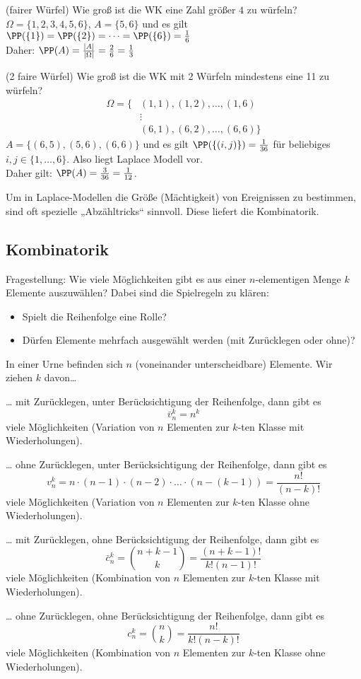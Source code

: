 \begin{anumerate}
\item (fairer Würfel) Wie groß ist die WK eine Zahl größer $4$ zu würfeln?\\
$\Omega = \{1,2,3,4,5,6\}$, $A=\{5,6\}$ und es gilt $\PP(\{1\})=\PP(\{2\})=\dots=\PP(\{6\})=\frac{1}{6}$\\
Daher: $\PP(A) = \frac{|A|}{|\Omega|}=\frac{2}{6}=\frac{1}{3}$
\item (2 faire Würfel) Wie groß ist die WK mit 2 Würfeln mindestens eine 11 zu würfeln?
\begin{align*}
\Omega=\{ & (1,1), (1,2), \dots , (1,6)\\
&\vdots\\
&(6,1), (6,2), \dots , (6,6)\}
\end{align*}
$A=\{(6,5), (5,6), (6,6)\}$ und es gilt $\PP(\{(i,j)\})=\frac{1}{36}$ für beliebiges $i,j \in \{1,\dots,6\}$. Also liegt Laplace Modell vor.\\
Daher gilt: $\PP(A) = \frac{3}{36}= \frac{1}{12}$.
\end{anumerate}
Um in Laplace-Modellen die Größe (Mächtigkeit) von Ereignissen zu bestimmen, sind oft spezielle „Abzähltricks“ sinnvoll. Diese liefert die Kombinatorik.

\subsection{Kombinatorik}
Fragestellung: Wie viele Möglichkeiten gibt es aus einer $n$-elementigen Menge $k$ Elemente auszuwählen? Dabei sind die Spielregeln zu klären:
\begin{itemize}
\item Spielt die Reihenfolge eine Rolle?
\item Dürfen Elemente mehrfach ausgewählt werden (mit Zurücklegen oder ohne)?
\end{itemize}

 In einer Urne befinden sich $n$ (voneinander unterscheidbare) Elemente. Wir ziehen $k$ davon…
\begin{anumerate}
\item … mit Zurücklegen, unter Berücksichtigung der Reihenfolge, dann gibt es
\[\bar v_n^k = n^k\]
viele Möglichkeiten (Variation von $n$ Elementen zur $k$-ten Klasse mit Wiederholungen).
\item … ohne Zurücklegen, unter Berücksichtigung der Reihenfolge, dann gibt es
\[v_n^k=n\cdot (n-1) \cdot (n-2) \cdot \dots \cdot (n-(k-1))=\frac{n!}{(n-k)!}\]
viele Möglichkeiten (Variation von $n$ Elementen zur $k$-ten Klasse ohne Wiederholungen).
\item … mit Zurücklegen, ohne Berücksichtigung der Reihenfolge, dann gibt es
\[\bar c_n^k=\binom{n+k-1}{k}=\frac{(n+k-1)!}{k!(n-1)!}\]
viele Möglichkeiten (Kombination von $n$ Elementen zur $k$-ten Klasse mit Wiederholungen).
\item … ohne Zurücklegen, ohne Berücksichtigung der Reihenfolge, dann gibt es
\[c_n^k=\binom{n}{k}=\frac{n!}{k!(n-k)!}\]
viele Möglichkeiten (Kombination von $n$ Elementen zur $k$-ten Klasse ohne Wiederholungen).
\end{anumerate}

